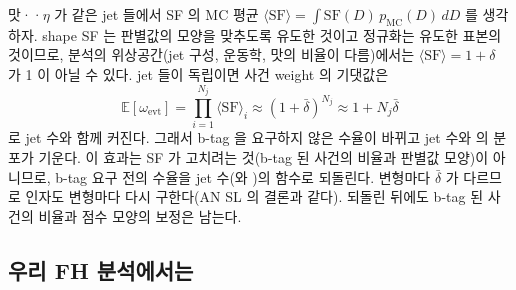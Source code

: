 \begin{note}
맛·\pt·$\eta$ 가 같은 jet 들에서 SF 의 MC 평균 $\langle\mathrm{SF}\rangle = \int \mathrm{SF}(D)\,p_\text{MC}(D)\,dD$ 를 생각하자. shape SF 는 판별값의
모양을 맞추도록 유도한 것이고 정규화는 유도한 표본의 것이므로, 분석의 위상공간(jet 구성, 운동학, 맛의 비율이 다름)에서는
$\langle\mathrm{SF}\rangle = 1+\delta$ 가 1 이 아닐 수 있다. jet 들이 독립이면 사건 weight 의 기댓값은
\begin{equation}
  \mathbb{E}[\omega_\text{evt}] = \prod_{i=1}^{N_j} \langle\mathrm{SF}\rangle_i \approx (1+\bar\delta)^{N_j} \approx 1 + N_j\bar\delta
  \label{eq:btag-shape-bias}
\end{equation}
로 jet 수와 함께 커진다. 그래서 b-tag 을 요구하지 않은 수율이 바뀌고 jet 수와 \HT{} 의 분포가 기운다. 이 효과는 SF 가 고치려는 것(b-tag 된
사건의 비율과 판별값 모양)이 아니므로, b-tag 요구 전의 수율을 jet 수(와 \HT)의 함수로 되돌린다. 변형마다 $\bar\delta$ 가 다르므로 인자도
변형마다 다시 구한다(AN SL 의 결론과 같다). 되돌린 뒤에도 b-tag 된 사건의 비율과 점수 모양의 보정은 남는다.
\end{note}

\subsection{우리 FH 분석에서는}\label{sec:btag-run2-ours}

